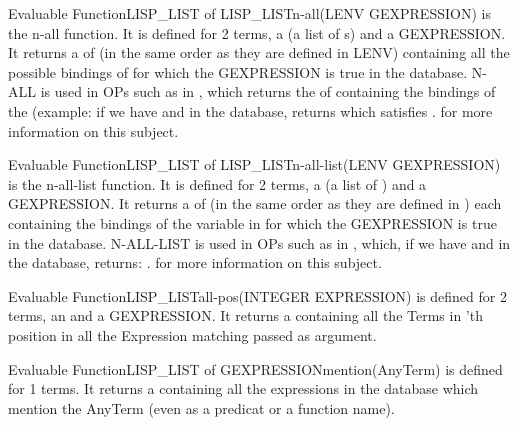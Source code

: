 \begin{typeefa}{Evaluable Function}{LISP\_LIST of LISP\_LIST}{n-all}{(LENV GEXPRESSION)}
is the n-all function. It is defined for 2 terms, a  (a list of
s) and a GEXPRESSION. It returns a  of
 (in the same order as they are defined in LENV) containing all
the possible bindings of  for which the GEXPRESSION is true in the
database. N-ALL is used in OPs such as in , which returns the  of 
containing the bindings of the  (example: if we have  and  in the database, returns  which satisfies .  for more information on this subject.
\end{typeefa}

\begin{typeefa}{Evaluable Function}{LISP\_LIST of LISP\_LIST}{n-all-list}{(LENV GEXPRESSION)}
is the n-all-list function. It is defined for 2 terms, a  (a list of
) and a GEXPRESSION. It returns a  of
 (in the same order as they are defined in ) each
containing the bindings of the variable in  for which the
GEXPRESSION is true in the database.  N-ALL-LIST is used in OPs such as in
, which, if we have
 and  in the database, returns: .  for more
information on this subject. 
\end{typeefa}

\begin{typeefa}{Evaluable Function}{LISP\_LIST}{all-pos}{(INTEGER EXPRESSION)}
is defined for 2 terms, an  and a
GEXPRESSION.  It returns a  containing all the Terms in
'th position in all the Expression matching 
passed as argument.
\end{typeefa}

\begin{typeefa}{Evaluable Function}{LISP\_LIST of GEXPRESSION}{mention}{(AnyTerm)}
is defined for 1 terms.  It returns a  containing all the
expressions in the database which mention the AnyTerm (even as a predicat or a
function name).
\end{typeefa}

